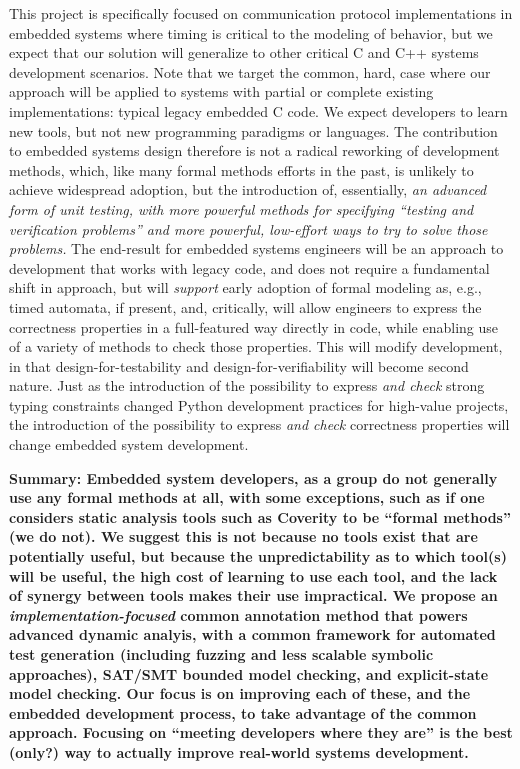 This project is specifically focused on communication protocol implementations in embedded systems where timing is critical to the modeling of behavior, but we expect that our solution will generalize to other critical C and C++ systems development scenarios.  Note that we target the common, hard, case where our approach will be applied to systems with partial or complete existing implementations: typical legacy embedded C code.  We expect developers to learn new tools, but not new programming paradigms or languages.  The contribution to embedded systems design therefore is not a radical reworking of development methods, which, like many formal methods efforts in the past, is unlikely to achieve widespread adoption, but the introduction of, essentially, \emph{an advanced form of unit testing, with more powerful methods for specifying ``testing and verification problems'' and more powerful, low-effort ways to try to solve those problems.}  The end-result for embedded systems engineers will be an approach to development that works with legacy code, and does not require a fundamental shift in approach, but will \emph{support} early adoption of formal modeling as, e.g., timed automata, if present, and, critically, will allow engineers to express the correctness properties in a full-featured way directly in code, while enabling use of a variety of methods to check those properties.  This will modify development, in that design-for-testability and design-for-verifiability will become second nature.  Just as the introduction of the possibility to express \emph{and check} strong typing constraints changed Python development practices for high-value projects, the introduction of the possibility to express \emph{and check} correctness properties will change embedded system development.

{\bf Summary:  Embedded system developers, as a group do not generally use any formal methods at all, with some exceptions, such as if one considers static analysis tools such as Coverity to be ``formal methods'' (we do not).  We suggest this is not because no tools exist that are potentially useful, but because the unpredictability as to which tool(s) will be useful, the high cost of learning to use each tool, and the lack of synergy between tools makes their use impractical.  We propose an \emph{implementation-focused} common annotation method that powers advanced dynamic analyis, with a common framework for automated test generation (including fuzzing and less scalable symbolic approaches), SAT/SMT bounded model checking, and explicit-state model checking.  Our focus is on improving each of these, and the embedded development process, to take advantage of the common approach.  Focusing on ``meeting developers where they are'' is the best (only?) way to actually improve real-world systems development.}

